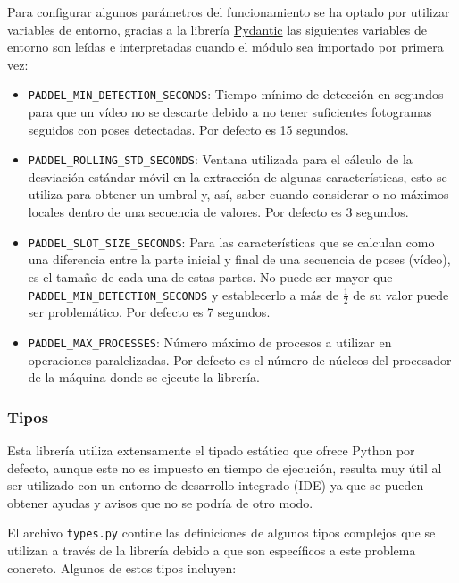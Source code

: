Para configurar algunos parámetros del funcionamiento se ha optado por utilizar
variables de entorno, gracias a la librería
\href{https://docs.pydantic.dev/latest/}{Pydantic} las siguientes variables de
entorno son leídas e interpretadas cuando el módulo sea importado por primera
vez:

\begin{itemize}
    \item \texttt{PADDEL\_MIN\_DETECTION\_SECONDS}: Tiempo mínimo de detección en
    segundos para que un vídeo no se descarte debido a no tener suficientes
    fotogramas seguidos con poses detectadas. Por defecto es 15 segundos.
    \item \texttt{PADDEL\_ROLLING\_STD\_SECONDS}: Ventana utilizada para el cálculo
    de la desviación estándar móvil en la extracción de algunas características,
    esto se utiliza para obtener un umbral y, así, saber cuando considerar o no
    máximos locales dentro de una secuencia de valores. Por defecto es 3
    segundos.
    \item \texttt{PADDEL\_SLOT\_SIZE\_SECONDS}: Para las características que se
    calculan como una diferencia entre la parte inicial y final de una secuencia
    de poses (vídeo), es el tamaño de cada una de estas partes. No puede ser
    mayor que \texttt{PADDEL\_MIN\_DETECTION\_SECONDS} y establecerlo a más de
    $\frac{1}{2}$ de su valor puede ser problemático. Por defecto es 7 segundos.
    \item \texttt{PADDEL\_MAX\_PROCESSES}: Número máximo de procesos a utilizar en
    operaciones paralelizadas. Por defecto es el número de núcleos del
    procesador de la máquina donde se ejecute la librería.
\end{itemize}

\subsubsection{Tipos}

Esta librería utiliza extensamente el tipado estático que ofrece Python por
defecto, aunque este no es impuesto en tiempo de ejecución, resulta muy útil al
ser utilizado con un entorno de desarrollo integrado (IDE) ya que se pueden
obtener ayudas y avisos que no se podría de otro modo.

El archivo \texttt{types.py} contine las definiciones de algunos tipos complejos
que se utilizan a través de la librería debido a que son específicos a este
problema concreto. Algunos de estos tipos incluyen:

